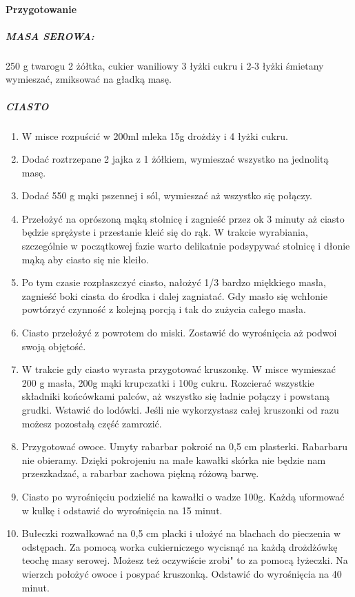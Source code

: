 \documentclass[12pt, letterpaper, titlepage]{article}
\begin{document}
\paragraph {Przygotowanie}
\subparagraph{MASA SEROWA:}
250 g twarogu 2 żółtka, cukier waniliowy 3 łyżki cukru i 2-3 łyżki śmietany wymieszać, zmiksować na gładką masę.
\subparagraph{CIASTO} 
\begin{enumerate}[1]
\item W misce rozpuścić w 200ml mleka 15g drożdży i 4 łyżki cukru.
\item Dodać roztrzepane 2 jajka z 1 żółkiem, wymieszać wszystko na jednolitą masę.
\item Dodać 550 g mąki pszennej i sól, wymieszać aż wszystko się połączy.
\item Przełożyć na oprószoną mąką stolnicę i zagnieść przez ok 3 minuty aż ciasto będzie sprężyste i przestanie kleić się do rąk. W trakcie wyrabiania, szczególnie w początkowej fazie warto delikatnie podsypywać stolnicę i dłonie mąką aby ciasto się nie kleiło.
\item Po tym czasie rozpłaszczyć ciasto, nałożyć 1/3 bardzo miękkiego masła, zagnieść boki ciasta do środka i dalej zagniatać. Gdy masło się wchłonie powtórzyć czynność z kolejną porcją i tak do zużycia całego masła.
\item Ciasto przełożyć z powrotem do miski. Zostawić do wyrośnięcia aż podwoi swoją objętość.
\item W trakcie gdy ciasto wyrasta przygotować kruszonkę. W misce wymieszać 200 g masła, 200g mąki krupczatki i 100g cukru. Rozcierać wszystkie składniki końcówkami palców, aż wszystko się ładnie połączy i powstaną grudki. Wstawić do lodówki. Jeśli nie wykorzystasz całej kruszonki od razu możesz pozostałą część zamrozić.
\item Przygotować owoce. Umyty rabarbar pokroić na 0,5 cm plasterki. Rabarbaru nie obieramy. Dzięki pokrojeniu na małe kawałki skórka nie będzie nam przeszkadzać, a rabarbar zachowa piękną różową barwę.
\item Ciasto po wyrośnięciu podzielić na kawałki o wadze 100g. Każdą uformować w kulkę i odstawić do wyrośnięcia na 15 minut.
\item Bułeczki rozwałkować na 0,5 cm placki i ułożyć na blachach do pieczenia w odstępach. Za pomocą worka cukierniczego wycisnąć na każdą drożdżówkę teochę masy serowej. Możesz też oczywiście zrobi" to za pomocą łyżeczki. Na wierzch położyć owoce i posypać kruszonką. Odstawić do wyrośnięcia na 40 minut.

\end{enumerate}
\end{document}

